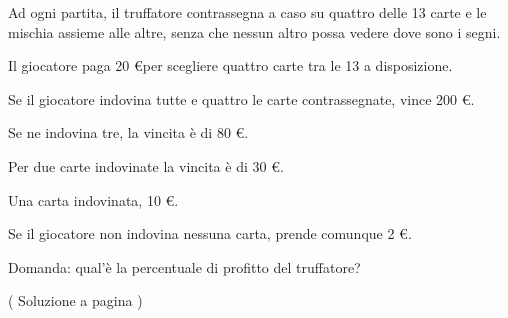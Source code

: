 \begin{enumerate}
Ad ogni partita, il truffatore contrassegna a caso su
quattro delle 13 carte e le mischia assieme alle altre, senza che nessun 
altro possa vedere dove sono i segni.

Il giocatore paga 20 \euro \hspace{1mm}per scegliere quattro carte tra le 13 a disposizione.

Se il giocatore indovina tutte e quattro le carte contrassegnate, vince 200 \euro.

Se ne indovina tre, la vincita è di 80 \euro.

Per due carte indovinate la vincita è di 30 \euro.

Una carta indovinata, 10 \euro.

Se il giocatore non indovina nessuna carta, prende comunque 2 \euro.

Domanda: qual'è la percentuale di profitto del truffatore?


( Soluzione a pagina \pageref{combs_05} \label{combl_05} )




\end{enumerate}

